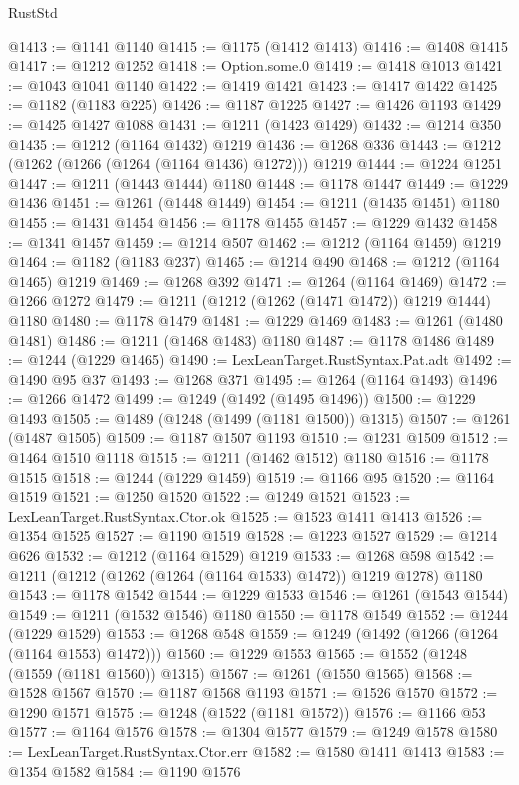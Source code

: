 \begin{lexlean}{RustStd}
\begin{coremodule}
@1413 := @1141 @1140
@1415 := @1175 (@1412 @1413)
@1416 := @1408 @1415
@1417 := @1212 @1252
@1418 := Option.some.{0}
@1419 := @1418 @1013
@1421 := @1043 @1041 @1140
@1422 := @1419 @1421
@1423 := @1417 @1422
@1425 := @1182 (@1183 @225)
@1426 := @1187 @1225
@1427 := @1426 @1193
@1429 := @1425 @1427 @1088
@1431 := @1211 (@1423 @1429)
@1432 := @1214 @350
@1435 := @1212 (@1164 @1432) @1219
@1436 := @1268 @336
@1443 := @1212 (@1262 (@1266 (@1264 (@1164 @1436) @1272))) @1219
@1444 := @1224 @1251
@1447 := @1211 (@1443 @1444) @1180
@1448 := @1178 @1447
@1449 := @1229 @1436
@1451 := @1261 (@1448 @1449)
@1454 := @1211 (@1435 @1451) @1180
@1455 := @1431 @1454
@1456 := @1178 @1455
@1457 := @1229 @1432
@1458 := @1341 @1457
@1459 := @1214 @507
@1462 := @1212 (@1164 @1459) @1219
@1464 := @1182 (@1183 @237)
@1465 := @1214 @490
@1468 := @1212 (@1164 @1465) @1219
@1469 := @1268 @392
@1471 := @1264 (@1164 @1469)
@1472 := @1266 @1272
@1479 := @1211 (@1212 (@1262 (@1471 @1472)) @1219 @1444) @1180
@1480 := @1178 @1479
@1481 := @1229 @1469
@1483 := @1261 (@1480 @1481)
@1486 := @1211 (@1468 @1483) @1180
@1487 := @1178 @1486
@1489 := @1244 (@1229 @1465)
@1490 := LexLeanTarget.RustSyntax.Pat.adt
@1492 := @1490 @95 @37
@1493 := @1268 @371
@1495 := @1264 (@1164 @1493)
@1496 := @1266 @1472
@1499 := @1249 (@1492 (@1495 @1496))
@1500 := @1229 @1493
@1505 := @1489 (@1248 (@1499 (@1181 @1500)) @1315)
@1507 := @1261 (@1487 @1505)
@1509 := @1187 @1507 @1193
@1510 := @1231 @1509
@1512 := @1464 @1510 @1118
@1515 := @1211 (@1462 @1512) @1180
@1516 := @1178 @1515
@1518 := @1244 (@1229 @1459)
@1519 := @1166 @95
@1520 := @1164 @1519
@1521 := @1250 @1520
@1522 := @1249 @1521
@1523 := LexLeanTarget.RustSyntax.Ctor.ok
@1525 := @1523 @1411 @1413
@1526 := @1354 @1525
@1527 := @1190 @1519
@1528 := @1223 @1527
@1529 := @1214 @626
@1532 := @1212 (@1164 @1529) @1219
@1533 := @1268 @598
@1542 := @1211 (@1212 (@1262 (@1264 (@1164 @1533) @1472)) @1219 @1278) @1180
@1543 := @1178 @1542
@1544 := @1229 @1533
@1546 := @1261 (@1543 @1544)
@1549 := @1211 (@1532 @1546) @1180
@1550 := @1178 @1549
@1552 := @1244 (@1229 @1529)
@1553 := @1268 @548
@1559 := @1249 (@1492 (@1266 (@1264 (@1164 @1553) @1472)))
@1560 := @1229 @1553
@1565 := @1552 (@1248 (@1559 (@1181 @1560)) @1315)
@1567 := @1261 (@1550 @1565)
@1568 := @1528 @1567
@1570 := @1187 @1568 @1193
@1571 := @1526 @1570
@1572 := @1290 @1571
@1575 := @1248 (@1522 (@1181 @1572))
@1576 := @1166 @53
@1577 := @1164 @1576
@1578 := @1304 @1577
@1579 := @1249 @1578
@1580 := LexLeanTarget.RustSyntax.Ctor.err
@1582 := @1580 @1411 @1413
@1583 := @1354 @1582
@1584 := @1190 @1576

\end{coremodule}
\end{lexlean}
